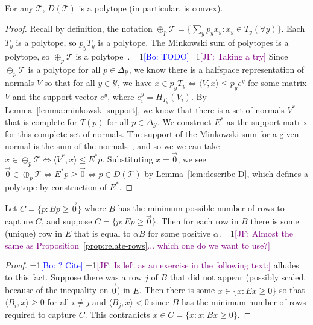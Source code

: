 \documentclass[final]{colt2020} %
\newcommand{\Comments}{1}
\newcommand{\mynote}[2]{\ifnum\Comments=1\textcolor{#1}{#2}\fi}
\newcommand{\jessie}[1]{\mynote{purple}{[JF: #1]}}
\newcommand{\bo}[1]{\mynote{blue}{[Bo: #1]}}
\newcommand{\simplex}{\Delta_\Y}
\newcommand{\T}{\mathcal{T}}
\newcommand{\Y}{\mathcal{Y}}
\newcommand{\inprod}[2]{\langle #1, #2 \rangle}%
\begin{document}
\begin{lemma} \label{lemma:D-polytope}
	For any $\T$, $D(\T)$ is a polytope (in particular, is convex).
\end{lemma}
\begin{proof}
	Recall by definition, the notation $\oplus_p \T = \{\sum_y p_y x_y : x_y \in T_y (\forall y)\}$.
	Each $T_y$ is a polytope, so $p_y T_y$ is a polytope.
	The Minkowski sum of polytopes is a polytope, so $\oplus_p \T$ is a polytope~\citep[Section 1.2]{weibel2007minkowski}.
	\bo{TODO}\jessie{Taking a try}
	Since $\oplus_p \T$ is a polytope for all $p \in \simplex$, we know there is a halfspace representation of normals $V$ so that for all $y \in \Y$, we have $x \in p_yT_y \iff \inprod{V}{x} \leq p_y e^y$ for some matrix $V$ and the support vector $e^y$, where $e^y_i = H_{T_y}(V_i)$.
	By Lemma~\ref{lemma:minkowski-support}, we know that there is a set of normals $V^*$ that is complete for $T(p)$ for all $p \in \simplex$.
	We construct $E^*$ as the support matrix for this complete set of normals.
    The support of the Minkowski sum for a given normal is the sum of the normals~\citep[Theorem 3.1.6]{weibel2007minkowski}, and so we we can take $x \in \oplus_p \T \iff \inprod{V^*}{x} \leq E^*p$.
	Substituting $x = \vec 0$, we see $\vec 0 \in \oplus_p \T \iff E^*p \geq \vec 0 \iff p \in D(\T)$ by Lemma~\ref{lem:describe-D}, which defines a polytope by construction of $E^*$.
\end{proof}


\begin{lemma} \label{lemma:E-to-B}
	Let $C = \{p : Bp \geq \vec 0 \}$ where $B$ has the minimum possible number of rows to capture $C$, and suppose $C = \{p : Ep \geq \vec 0 \}$.
	Then for each row in $B$ there is some (unique) row in $E$ that is equal to $\alpha B$ for some positive $\alpha$.
	\jessie{Almost the same as Proposition~\ref{prop:relate-rows}... which one do we want to use?}
\end{lemma}
\begin{proof}
	\bo{? Cite} \jessie{Is left as an exercise in the following text:} \citet[Exercise 2.15]{ziegler2012lectures} alludes to this fact.
	Suppose there was a row $j$ of $B$ that did not appear (possibly scaled, because of the inequality on $\vec 0$) in $E$.
	Then there is some $x \in \{x : Ex \geq 0\}$ so that $\inprod{B_i}{x} \geq 0$ for all $i \neq j$ and $\inprod{B_j}{x} < 0$ since $B$ has the minimum number of rows required to capture $C$.
	This contradicts $x \in C = \{x : x : Bx \geq 0\}$.
\end{proof}
\end{document}
